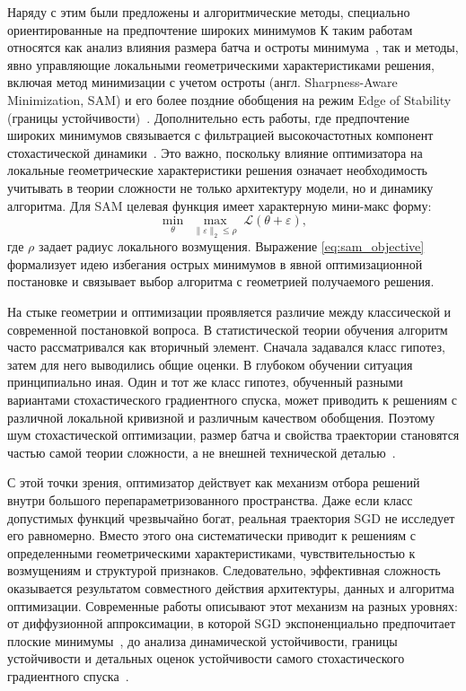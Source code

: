 \documentclass[russian]{intsys}
\begin{document}
Наряду с этим были предложены и алгоритмические методы, специально ориентированные на предпочтение широких минимумов
К таким работам относятся как анализ влияния размера батча и остроты минимума~\cite{keskar2017largebatch}, так и методы, явно управляющие локальными геометрическими характеристиками решения, включая метод минимизации с учетом остроты (англ. Sharpness-Aware Minimization, SAM) и его более поздние обобщения на режим Edge of Stability (границы устойчивости)~\cite{foret2021sam,sam2023eos}.
Дополнительно есть работы, где предпочтение широких минимумов связывается с фильтрацией высокочастотных компонент стохастической динамики~\cite{lowpass2022flat}.
Это важно, поскольку влияние оптимизатора на локальные геометрические характеристики решения означает необходимость учитывать в теории сложности не только архитектуру модели, но и динамику алгоритма.
Для SAM целевая функция имеет характерную мини-макс форму:
\begin{equation}
\min_{\theta}\;\max_{\|\varepsilon\|_2\le \rho}\;\mathcal L(\theta+\varepsilon),
\label{eq:sam_objective}
\end{equation}
где $\rho$ задает радиус локального возмущения.
Выражение \eqref{eq:sam_objective} формализует идею избегания острых минимумов в явной оптимизационной постановке и связывает выбор алгоритма с геометрией получаемого решения.

На стыке геометрии и оптимизации проявляется различие между классической и современной постановкой вопроса.
В статистической теории обучения алгоритм часто рассматривался как вторичный элемент.
Сначала задавался класс гипотез, затем для него выводились общие оценки.
В глубоком обучении ситуация принципиально иная.
Один и тот же класс гипотез, обученный разными вариантами стохастического градиентного спуска, может приводить к решениям с различной локальной кривизной и различным качеством обобщения.
Поэтому шум стохастической оптимизации, размер батча и свойства траектории становятся частью самой теории сложности, а не внешней технической деталью~\cite{hardt2016train,bousquet2002stability}.

С этой точки зрения, оптимизатор действует как механизм отбора решений внутри большого перепараметризованного пространства.
Даже если класс допустимых функций чрезвычайно богат, реальная траектория SGD не исследует его равномерно.
Вместо этого она систематически приводит к решениям с определенными геометрическими характеристиками, чувствительностью к возмущениям и структурой признаков.
Следовательно, эффективная сложность оказывается результатом совместного действия архитектуры, данных и алгоритма оптимизации.
Современные работы описывают этот механизм на разных уровнях: от диффузионной аппроксимации, в которой SGD экспоненциально предпочитает плоские минимумы~\cite{wu2020sgdflat}, до анализа динамической устойчивости, границы устойчивости и детальных оценок устойчивости самого стохастического градиентного спуска~\cite{sgdstability2023,sgd2020stability,mei2021eos}.
\end{document}
